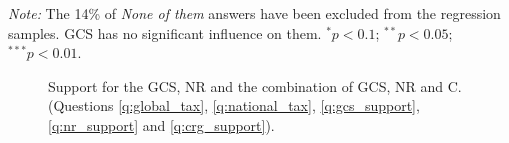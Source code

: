 \documentclass[12pt,english]{article}
\begin{document}
\begin{table}[h]
  \caption[Influence of the GCS on electoral prospects]{Preference for a progressive platform depending on whether it includes the GCS or not. (Question \ref{q:conjoint_c}) 
} %
  \label{tab:conjoint_c}
  {\footnotesize \textit{Note:} The 14\% of \textit{None of them} answers have been excluded from the regression samples. GCS has no significant influence on them. $^{*}p<0.1$; $^{**} p<0.05$; $^{***} p<0.01$. 
  }
\end{table}

\begin{figure}[h!]
  \caption[Support for the Global Climate Scheme]{Support for the GCS, NR and the combination of GCS, NR and C. \\(Questions \ref{q:global_tax}, \ref{q:national_tax}, \ref{q:gcs_support}, \ref{q:nr_support} and \ref{q:crg_support}).%
  }\label{fig:support_binary}
\end{figure}
\end{document}
